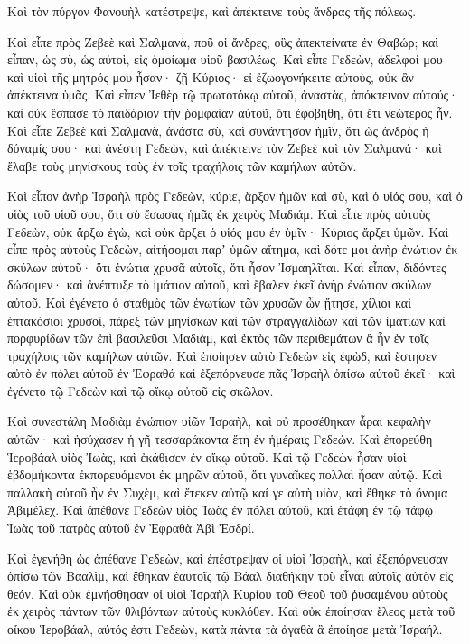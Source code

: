 {Καὶ τὸν πύργον Φανουὴλ κατέστρεψε, καὶ ἀπέκτεινε τοὺς ἄνδρας τῆς πόλεως.
\par }{\PP {}Καὶ εἶπε πρὸς Ζεβεὲ καὶ Σαλμανὰ, ποῦ οἱ ἄνδρες, οὓς ἀπεκτείνατε ἐν Θαβώρ; καὶ εἶπαν, ὡς σὺ, ὡς αὐτοὶ, εἰς ὁμοίωμα υἱοῦ βασιλέως.
Καὶ εἶπε Γεδεὼν, ἀδελφοί μου καὶ υἱοὶ τῆς μητρός μου ἦσαν· ζῇ Κύριος· εἰ ἐζωογονήκειτε αὐτοὺς, οὐκ ἂν ἀπέκτεινα ὑμᾶς.
Καὶ εἶπεν Ἰεθὲρ τῷ πρωτοτόκῳ αὐτοῦ, ἀναστὰς, ἀπόκτεινον αὐτούς· καὶ οὐκ ἔσπασε τὸ παιδάριον τὴν ῥομφαίαν αὐτοῦ, ὅτι ἐφοβήθη, ὅτι ἔτι νεώτερος ἦν.
Καὶ εἶπε Ζεβεὲ καὶ Σαλμανὰ, ἀνάστα σὺ, καὶ συνάντησον ἡμῖν, ὅτι ὡς ἀνδρὸς ἡ δύναμίς σου· καὶ ἀνέστη Γεδεὼν, καὶ ἀπέκτεινε τὸν Ζεβεὲ καὶ τὸν Σαλμανά· καὶ ἔλαβε τοὺς μηνίσκους τοὺς ἐν τοῖς τραχήλοις τῶν καμήλων αὐτῶν.
\par }{\PP {}Καὶ εἶπον ἀνὴρ Ἰσραὴλ πρὸς Γεδεὼν, κύριε, ἄρξον ἡμῶν καὶ σὺ, καὶ ὁ υἱός σου, καὶ ὁ υἱὸς τοῦ υἱοῦ σου, ὅτι σὺ ἔσωσας ἡμᾶς ἐκ χειρὸς Μαδιάμ.
Καὶ εἶπε πρὸς αὐτοὺς Γεδεὼν, οὐκ ἄρξω ἐγὼ, καὶ οὐκ ἄρξει ὁ υἱός μου ἐν ὑμῖν· Κύριος ἄρξει ὑμῶν.
Καὶ εἶπε πρὸς αὐτοὺς Γεδεὼν, αἰτήσομαι παρʼ ὑμῶν αἴτημα, καὶ δότε μοι ἀνὴρ ἐνώτιον ἐκ σκύλων αὐτοῦ· ὅτι ἐνώτια χρυσᾶ αὐτοῖς, ὅτι ἦσαν Ἰσμαηλῖται.
Καὶ εἶπαν, διδόντες δώσομεν· καὶ ἀνέπτυξε τὸ ἱμάτιον αὐτοῦ, καὶ ἔβαλεν ἐκεῖ ἀνὴρ ἐνώτιον σκύλων αὐτοῦ.
Καὶ ἐγένετο ὁ σταθμὸς τῶν ἐνωτίων τῶν χρυσῶν ὧν ᾔτησε, χίλιοι καὶ ἑπτακόσιοι χρυσοὶ, πάρεξ τῶν μηνίσκων καὶ τῶν στραγγαλίδων καὶ τῶν ἱματίων καὶ πορφυρίδων τῶν ἐπὶ βασιλεῦσι Μαδιὰμ, καὶ ἐκτὸς τῶν περιθεμάτων ἃ ἦν ἐν τοῖς τραχήλοις τῶν καμήλων αὐτῶν.
Καὶ ἐποίησεν αὐτὸ Γεδεὼν εἰς ἐφὼδ, καὶ ἔστησεν αὐτὸ ἐν πόλει αὐτοῦ ἐν Ἐφραθά καὶ ἐξεπόρνευσε πᾶς Ἰσραὴλ ὀπίσω αὐτοῦ ἐκεῖ· καὶ ἐγένετο τῷ Γεδεὼν καὶ τῷ οἴκῳ αὐτοῦ εἰς σκῶλον.
\par }{\PP {}Καὶ συνεστάλη Μαδιὰμ ἐνώπιον υἱῶν Ἰσραὴλ, καὶ οὐ προσέθηκαν ἆραι κεφαλὴν αὐτῶν· καὶ ἡσύχασεν ἡ γῆ τεσσαράκοντα ἔτη ἐν ἡμέραις Γεδεών.
Καὶ ἐπορεύθη Ἱεροβάαλ υἱὸς Ἰωὰς, καὶ ἐκάθισεν ἐν οἴκῳ αὐτοῦ.
Καὶ τῷ Γεδεὼν ἦσαν υἱοὶ ἑβδομήκοντα ἐκπορευόμενοι ἐκ μηρῶν αὐτοῦ, ὅτι γυναῖκες πολλαὶ ἦσαν αὐτῷ.
Καὶ παλλακὴ αὐτοῦ ἦν ἐν Συχὲμ, καὶ ἔτεκεν αὐτῷ καί γε αὐτὴ υἱὸν, καὶ ἔθηκε τὸ ὄνομα Ἀβιμέλεχ.
Καὶ ἀπέθανε Γεδεὼν υἱὸς Ἰωὰς ἐν πόλει αὐτοῦ, καὶ ἐτάφη ἐν τῷ τάφῳ Ἰωὰς τοῦ πατρὸς αὐτοῦ ἐν Ἐφραθὰ Ἀβὶ Ἐσδρί.
\par }{\PP {}Καὶ ἐγενήθη ὡς ἀπέθανε Γεδεὼν, καὶ ἐπέστρεψαν οἱ υἱοὶ Ἰσραὴλ, καὶ ἐξεπόρνευσαν ὀπίσω τῶν Βααλὶμ, καὶ ἔθηκαν ἑαυτοῖς τῷ Βάαλ διαθήκην τοῦ εἶναι αὐτοῖς αὐτὸν εἰς θεόν.
Καὶ οὐκ ἐμνήσθησαν οἱ υἱοὶ Ἰσραὴλ Κυρίου τοῦ Θεοῦ τοῦ ῥυσαμένου αὐτοὺς ἐκ χειρὸς πάντων τῶν θλιβόντων αὐτοὺς κυκλόθεν.
Καὶ οὐκ ἐποίησαν ἔλεος μετὰ τοῦ οἴκου Ἱεροβάαλ, αὐτός ἐστι Γεδεὼν, κατὰ πάντα τὰ ἀγαθὰ ἃ ἐποίησε μετὰ Ἰσραήλ.

}

